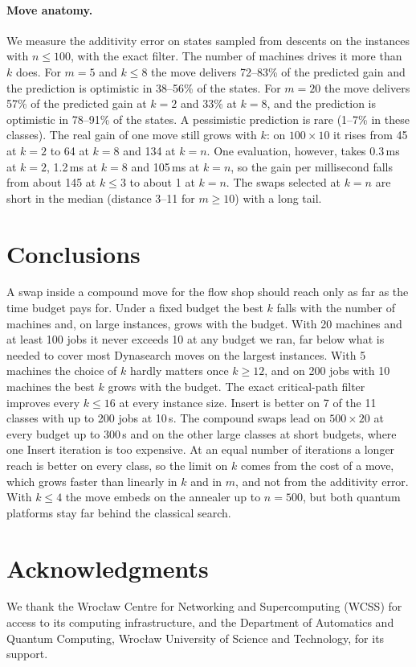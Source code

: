 \documentclass[letterpaper]{article} %
\theoremstyle{definition}
\newif\ifanon
\begin{document}
\paragraph{Move anatomy.}
We measure the additivity error on states sampled
from descents on the instances with $n\leq 100$, with the exact filter. The number of machines drives it more than $k$ does. For $m=5$ and $k\leq 8$
the move delivers 72--83\% of the predicted gain and the prediction is
optimistic in 38--56\% of the states. For $m=20$ the move delivers 57\%
of the predicted gain at $k=2$ and 33\% at $k=8$, and the prediction is
optimistic in 78--91\% of the states. A pessimistic prediction is rare
(1--7\% in these classes). The real gain of one move still grows with $k$: on
$100\times 10$ it rises from 45 at $k=2$ to 64 at $k=8$ and 134 at $k=n$.
One evaluation, however, takes 0.3\,ms at $k=2$, 1.2\,ms at $k=8$ and
105\,ms at $k=n$, so the gain per millisecond falls from about 145 at
$k\leq 3$ to about 1 at $k=n$. The swaps selected at $k=n$ are short in
the median (distance 3--11 for $m\geq 10$) with a long tail.



\section{Conclusions}
A swap inside a compound move for the flow shop should reach only as far
as the time budget pays for. Under a fixed budget the best $k$ falls with
the number of machines and, on large instances, grows with the budget. With 20 machines and at
least 100 jobs it never exceeds 10 at any budget we ran, far
below what is needed to cover most Dynasearch moves on the largest
instances. With 5 machines the choice of $k$ hardly matters once
$k\geq 12$, and on 200 jobs with 10 machines the best $k$ grows with the
budget. The exact critical-path filter improves every $k\leq 16$ at
every instance size. Insert is better on 7 of the 11 classes with up to
200 jobs at 10\,s. The compound swaps lead on $500\times 20$ at every budget up to 300\,s and on the other large classes
at short budgets, where one Insert iteration is too expensive. At an equal number of iterations a longer reach is better on every class, so the limit on $k$ comes from the cost of a move, which grows faster than linearly in $k$ and in $m$, and not from the additivity error. With $k\leq 4$ the move embeds on the annealer up to $n=500$, but both quantum platforms stay far behind the classical search.

\ifanon\else
\section*{Acknowledgments}
We thank the Wroc\l{}aw Centre for Networking and Supercomputing (WCSS)
for access to its computing infrastructure, and the Department of
Automatics and Quantum Computing, Wroc\l{}aw University of Science and
Technology, for its support.
\fi


\end{document}
